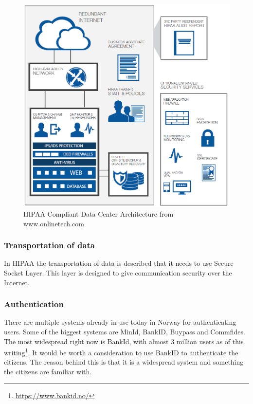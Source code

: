 \begin{figure}[H]
\centering
\includegraphics[scale=0.50]{../Figures/hipaa.png}
\caption{HIPAA Compliant Data Center Architecture from www.onlinetech.com}
\label{figure:HIPAA}
\end{figure}

\subsubsection{Transportation of data}
In HIPAA the transportation of data is described that it needs to use Secure Socket Layer. 
This layer is designed to give communication security over the Internet. \cite{SSL}

\subsubsection{Authentication}
There are multiple systems already in use today in Norway for authenticating users. 
Some of the biggest systems are MinId, BankID, Buypass and Commfides.
The most widespread right now is BankId, with almost 3 million users as of this writing\footnote{\href{https://www.bankid.no/}{https://www.bankid.no/}}.
It would be worth a consideration to use BankID to authenticate the citizens. 
The reason behind this is that it is a widespread system and something the citizens are familiar with. 

